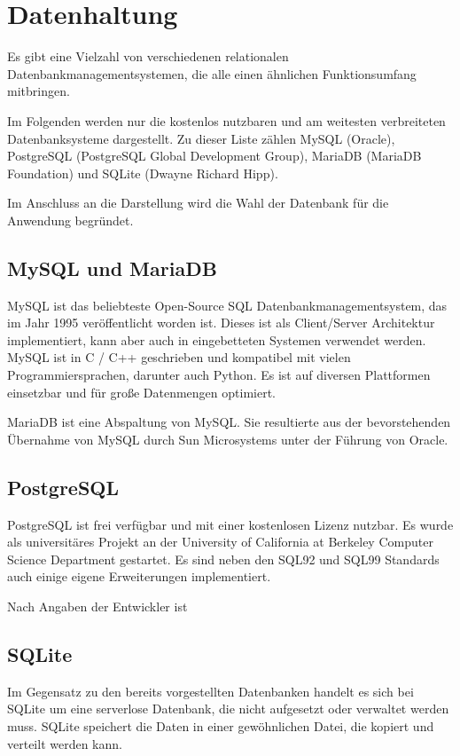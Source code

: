 \section{Datenhaltung} \label{sec:Datenhaltung}
Es gibt eine Vielzahl von verschiedenen relationalen Datenbankmanagementsystemen, die alle einen ähnlichen Funktionsumfang mitbringen.

Im Folgenden werden nur die kostenlos nutzbaren und am weitesten verbreiteten Datenbanksysteme dargestellt. Zu dieser Liste zählen MySQL (Oracle), PostgreSQL (PostgreSQL Global Development Group), MariaDB (MariaDB Foundation) und SQLite (Dwayne Richard Hipp). \cite{db-enginesDBEnginesRanking}

Im Anschluss an die Darstellung wird die Wahl der Datenbank für die Anwendung begründet.

\subsection{MySQL und MariaDB}
MySQL ist das beliebteste Open-Source SQL Datenbankmanagementsystem, das im Jahr 1995 veröffentlicht worden ist. Dieses ist als Client/Server Architektur implementiert, kann aber auch in eingebetteten Systemen verwendet werden. \cite{oraclecorporationMySQLMySQLReference2020} MySQL ist in C / C++ geschrieben und kompatibel mit vielen Programmiersprachen, darunter auch Python. Es ist auf diversen Plattformen einsetzbar und für große Datenmengen optimiert. \cite{oraclecorporationMySQLMySQLReference2020a}

MariaDB ist eine Abspaltung von MySQL. Sie resultierte aus der bevorstehenden Übernahme von MySQL durch Sun Microsystems unter der Führung von Oracle. \cite{ionosMariaDBVsMySQL2020}

\subsection{PostgreSQL}
PostgreSQL ist frei verfügbar und mit einer kostenlosen Lizenz nutzbar. Es wurde als universitäres Projekt an der University of California at Berkeley Computer Science Department gestartet. Es sind neben den SQL92 und SQL99 Standards auch einige eigene Erweiterungen implementiert. \cite{boenigkWasIstPostgreSQL} 

Nach Angaben der Entwickler ist  

\subsection{SQLite}
Im Gegensatz zu den bereits vorgestellten Datenbanken handelt es sich bei SQLite um eine serverlose Datenbank, die nicht aufgesetzt oder verwaltet werden muss. SQLite speichert die Daten in einer gewöhnlichen Datei, die kopiert und verteilt werden kann. \cite{sqliteFeaturesSQLite}

